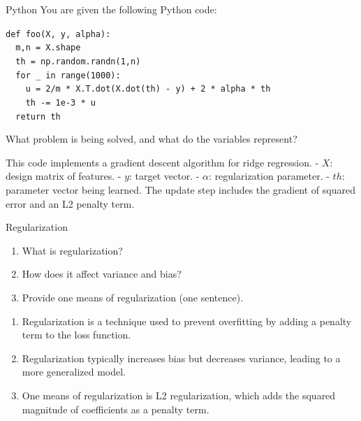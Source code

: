 \documentclass{article}
\begin{document}
\begin{exercise}{Python}
  You are given the following Python code:

  \medskip
  \texttt{def foo(X, y, alpha):}\\
  \texttt{\ \ m,n = X.shape}\\
  \texttt{\ \ th = np.random.randn(1,n)}\\
  \texttt{\ \ for \_ in range(1000):}\\
  \texttt{\ \ \ \ u = 2/m * X.T.dot(X.dot(th) - y) + 2 * alpha * th}\\
  \texttt{\ \ \ \ th -= 1e-3 * u}\\
  \texttt{\ \ return th}

  What problem is being solved, and what do the variables represent?

  \begin{solution}
    This code implements a gradient descent algorithm for ridge regression.  
    - $X$: design matrix of features.
    - $y$: target vector.
    - $\alpha$: regularization parameter.
    - $th$: parameter vector being learned.
    The update step includes the gradient of squared error and an L2 penalty term.
  \end{solution}
\end{exercise}

\begin{exercise}{Regularization}
  \begin{enumerate}
    \item What is regularization?
    \item How does it affect variance and bias?
    \item Provide one means of regularization (one sentence).
  \end{enumerate}

  \begin{solution}
    \begin{enumerate}
      \item Regularization is a technique used to prevent overfitting by adding a penalty term to the loss function.
      \item Regularization typically increases bias but decreases variance, leading to a more generalized model.
      \item One means of regularization is L2 regularization, which adds the squared magnitude of coefficients as a penalty term.
    \end{enumerate}
  \end{solution}
\end{exercise}
\end{document}
